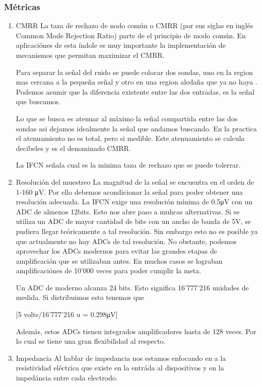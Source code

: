 \documentclass[11pt]{article}
\begin{document}
\subsubsection{Métricas}
\label{sec:org9e46728}
\begin{enumerate}
\item CMRR
\label{sec:org50943e0}
La taza de rechazo de nodo común o CMRR (por sus siglas en inglés Common Mode Rejection Ratio) parte de el principio de modo común.
En aplicaciónes de esta índole es muy importante la implementación de mecanismos que permitan maximizar el CMRR.

Para separar la señal del ruido se puede colocar dos sondas, uno en la region mas cercana a la pequeña señal y otro en una region aledaña que ya no haya . Podemos asumir que la diferencia existente entre las dos entradas, es la señal que buscamos.

Lo que se busca es atenuar al máximo la señal compartida entre las dos sondas asi dejamos idealmente la señal que andamos buscando. En la practica el atenuamiento no es total, pero si medible. Este atenuamiento se calcula decibeles y es el denominado CMRR.

La IFCN señala cual es la minima taza de rechazo que se puede tolerrar.

\item Resolución del muestreo
\label{sec:org38627cc}
La magnitud de la señal se encuentra en el orden de 1-160 μV. Por ello debemos acondicionar la señal para poder obtener una resolución adecuada. La IFCN exige una resolución mínima de 0.5μV con un ADC de almenos 12bits. Esto nos abre paso a muhcas alternativas. Si se utiliza un ADC de mayor cantidad de bits con un ancho de banda de 5V, se pudiera llegar teóricamente a tal resolución. Sin embargo esto no es posible ya que actualmente no hay ADCs de tal resolución. No obstante, podemos aprovechar los ADCs modernos para evitar las grandes etapas de amplificación que se utilizaban antes. En muchos casos se lograban amplificaciónes de 10’000 veces para poder cumplir la meta.

Un ADC de moderno alcanza 24 bits. Esto significa 16’777’216 unidades de medida. Si distribuimos esto tenemos que

[5 volts/16’777’216 u = 0.298μV]

Además, estos ADCs tienen integrados amplificadores hasta de 128 veces. Por lo cual se tiene una gran flexibilidad al respecto.

\item Impedancia
\label{sec:org5e727bb}
Al hablar de impedancia nos estamos enfocando en a la resistividad eléctrica que existe en la entráda al dispositivos y en la impedáncia entre cada electrodo.


\end{enumerate}
\end{document}
